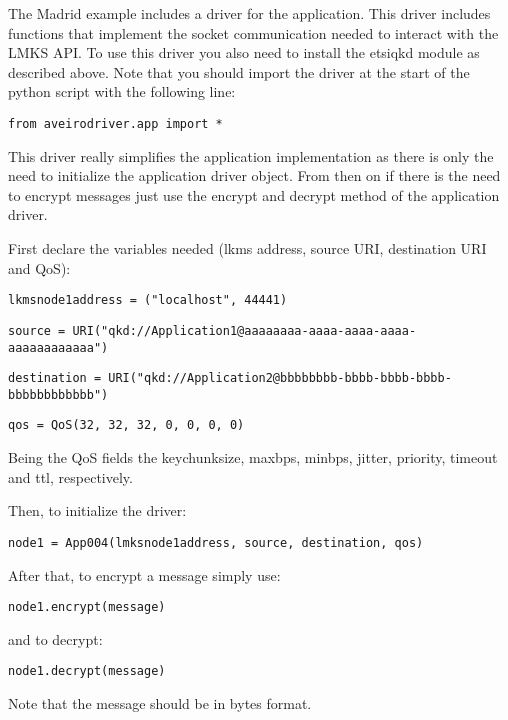 \begin{refsection}
The Madrid example includes a driver for the application. This driver includes functions that implement the socket communication needed to interact with the LMKS API. To use this driver you also need to install the etsi\textunderscore qkd module as described above. Note that you should import the driver at the start of the python script with the following line:

\texttt{from aveiro\textunderscore driver.app import *}

This driver really simplifies the application implementation as there is only the need to initialize the application driver object. From then on if there is the need to encrypt messages just use the encrypt and decrypt method of the application driver.

First declare the variables needed (lkms address, source URI, destination URI and QoS):

\texttt{lkms\textunderscore node1\textunderscore address = ("localhost", 44441)}

\texttt{source = URI("qkd://Application1@aaaaaaaa-aaaa-aaaa-aaaa-aaaaaaaaaaaa")}

\texttt{destination = URI("qkd://Application2@bbbbbbbb-bbbb-bbbb-bbbb-bbbbbbbbbbbb")}

\texttt{qos = QoS(32, 32, 32, 0, 0, 0, 0)}

Being the QoS fields the key\textunderscore chunk\textunderscore size, max\textunderscore bps, min\textunderscore bps, jitter, priority, timeout and ttl, respectively.

Then, to initialize the driver:

\texttt{node1 = App004(lmks\textunderscore node1\textunderscore address, source, destination, qos)}

After that, to encrypt a message simply use:

\texttt{node1.encrypt(message)}

and to decrypt:

\texttt{node1.decrypt(message)}

Note that the message should be in bytes format.




\end{refsection}
